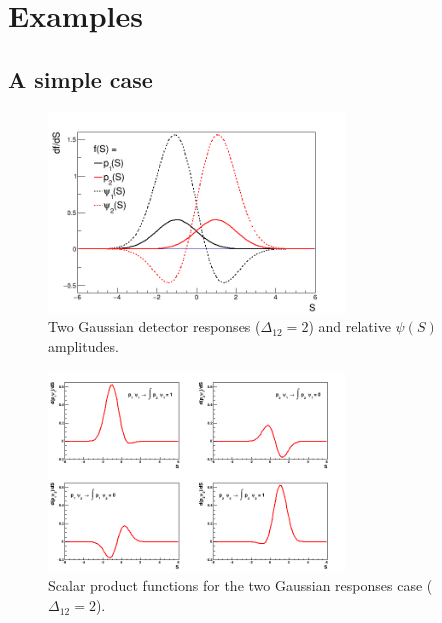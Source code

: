 \section{Examples}
\subsection{A simple case}

\begin{figure}[!htb]
\centering
\includegraphics[width=0.7\textwidth]{../png/figGaus2.png}
\caption{Two Gaussian detector responses ($\Delta_{12} = 2$) and relative
  $\psi(S)$ amplitudes.}
\label{fig:Gaus2}
\end{figure}

\begin{figure}[!htb]
\centering
\includegraphics[width=0.7\textwidth]{../png/figSPgaus.png}
\caption{Scalar product functions for the two Gaussian responses case ($\Delta_{12} = 2$).}
\label{fig:SPGaus2}
\end{figure}


